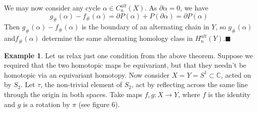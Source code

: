 \documentclass[11pt,a4paper,twoside]{article}
\theoremstyle{plain}
\theoremstyle{definition}
\theoremstyle{definition}
\theoremstyle{definition}
\theoremstyle{definition}
\newtheorem{example}[thm]{Example}
\theoremstyle{definition}
\begin{document}
We may now consider any cycle $\alpha\in C_n^{alt}(X)$. As $\partial\alpha =0$, we have
$$g_\#(\alpha)-f_\#(\alpha)=\partial P(\alpha)+P(\partial\alpha) = \partial P(\alpha)$$
Then $g_\#(\alpha)-f_\#(\alpha)$ is the boundary of an alternating chain in $Y$, so $g_\#(\alpha)$ and$f_\#(\alpha)$ determine the same alternating homology class in $H_n^{alt}(Y)$.\hfill$\blacksquare$\\





\begin{example}
\label{NonequivariantHomotopyVariance}
Let us relax just one condition from the above theorem. Suppose we required that the two homotopic maps be equivariant, but that they needn't be homotopic via an equivariant homotopy. Now consider $X=Y=S^1\subset\mathbb{C}$, acted on by $S_2$. Let $\tau$, the non-trivial element of $S_2$, act by reflecting across the same line through the origin in both spaces. Take maps $f,g\!:\!X\rightarrow Y$, where $f$ is the identity and $g$ is a rotation by $\pi$ (see figure 6).


\end{example}
\end{document}
